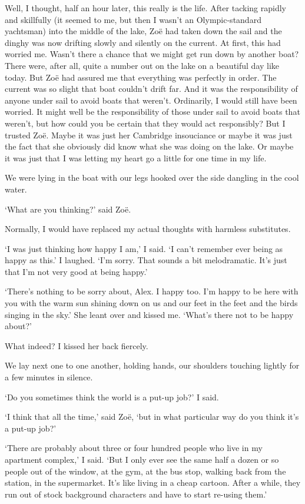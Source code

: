 Well, I thought, half an hour later, this really is the life. After
tacking rapidly and skillfully (it seemed to me, but then I wasn't
an Olympic-standard yachtsman) into the middle of the lake, Zoë
had taken down the sail and the dinghy was now drifting slowly and
silently on the current. At first, this had worried me. Wasn't there
a chance that we might get run down by another boat? There were,
after all, quite a number out on the lake on a beautiful day like
today. But Zoë had assured me that everything was perfectly in
order. The current was so slight that boat couldn't drift far. And
it was the responsibility of anyone under sail to avoid boats that
weren't. Ordinarily, I would still have been worried. It might well
be the responsibility of those under sail to avoid boats that
weren't, but how could you be certain that they would act
responsibly? But I trusted Zoë. Maybe it was just her Cambridge
insouciance or maybe it was just the fact that she obviously did
know what she was doing on the lake. Or maybe it was just that I was
letting my heart go a little for one time in my life.

We were lying in the boat with our legs hooked over the side
dangling in the cool water.

`What are you thinking?' said Zoë.

Normally, I would have replaced my actual thoughts with harmless
substitutes.

`I was just thinking how happy I am,' I said. `I can't remember
ever being as happy as this.' I laughed. `I'm sorry. That sounds a
bit melodramatic. It's just that I'm not very good at being happy.'

`There's nothing to be sorry about, Alex. I happy too. I'm happy to
be here with you with the warm sun shining down on us and our feet
in the feet and the birds singing in the sky.' She leant over and
kissed me. `What's there not to be happy about?'

What indeed? I kissed her back fiercely.

We lay next one to one another, holding hands, our shoulders
touching lightly for a few minutes in silence.

`Do you sometimes think the world is a put-up job?' I said.

`I think that all the time,' said Zoë, `but in what particular
way do you think it's a put-up job?'

`There are probably about three or four hundred people who live in
my apartment complex,' I said. `But I only ever see the same half a
dozen or so people out of the window, at the gym, at the bus stop,
walking back from the station, in the supermarket. It's like living
in a cheap cartoon. After a while, they run out of stock background
characters and have to start re-using them.'

